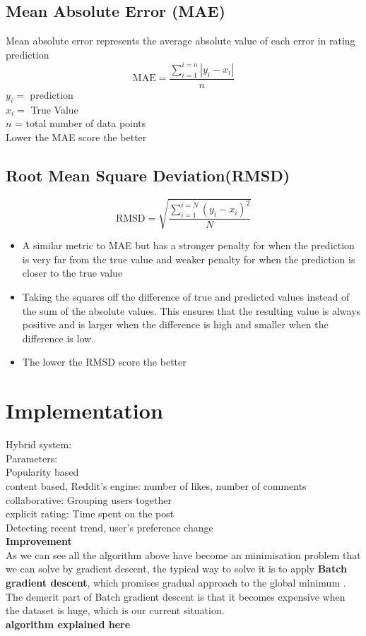 \subsection{Mean Absolute Error (MAE)}
Mean absolute error represents the average absolute value of each error in rating prediction
\begin{equation*}
\text{MAE} = \frac{\sum^{i=n}_{i=1}|y_{i} - x_{i}|}{n}
\end{equation*}
$y_{i}  = $ prediction
\\$x_{i}  = $ True Value
\\$n$ = total number of data points
\\Lower the MAE score the better

\subsection{Root Mean Square Deviation(RMSD)}
\begin{equation*}
\text{RMSD} = \sqrt{\frac{\sum^{i=N}_{i=1}(y_{i} - x_{i})^{2}}{N}}
\end{equation*}

\begin{itemize}
\item A similar metric to MAE but has a stronger penalty for when the prediction is very far from the true value and weaker penalty for when the prediction is closer to the true value
\item Taking the squares off the difference of true and predicted values instead of the sum of the absolute values. This ensures that the resulting value is always positive and is larger when the difference is high and smaller when the difference is low.
\item The lower the RMSD score the better
\end{itemize}


\section{Implementation}
Hybrid system:
\\Parameters: 
\\Popularity based
\\content based, Reddit's engine:  number of likes, number of comments
\\collaborative: Grouping users together
\\explicit rating: Time spent on the post
\\Detecting recent trend, user's preference change
\\ \textbf{Improvement}
\\ As we can see all the algorithm above have become an minimisation problem that we can solve by gradient descent, the typical way to solve it is to apply \textbf{Batch gradient descent}, which promises gradual approach to the global minimum . The demerit part of Batch gradient descent is that it becomes expensive when the dataset is huge, which is our current situation.
\\ \textbf{algorithm explained here}

